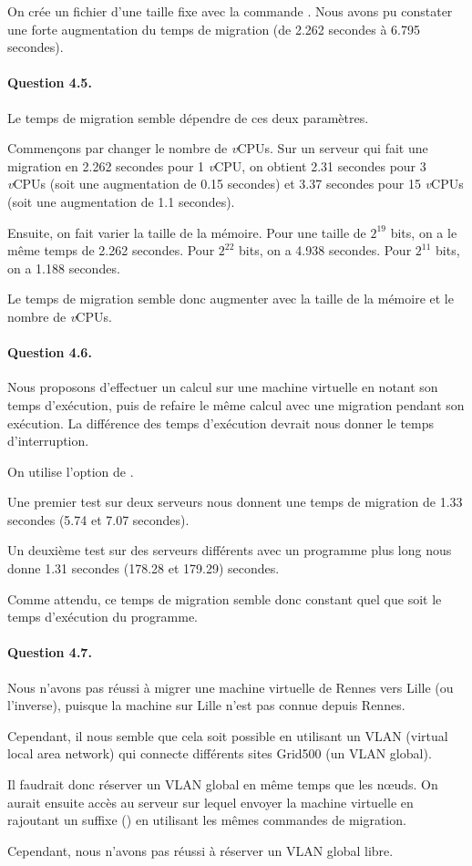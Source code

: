 \documentclass[12pt]{article}
\begin{document}
On crée un fichier d'une taille fixe avec la commande . Nous avons pu constater une forte augmentation du temps de migration (de 2.262 secondes à 6.795 secondes). 


\paragraph{Question 4.5.}

\def\vcpu{\textit{v}CPU}

Le temps de migration semble dépendre de ces deux paramètres.

Commençons par changer le nombre de \vcpu s. Sur un serveur qui fait une migration en 2.262 secondes pour 1 \vcpu, on obtient 2.31 secondes pour 3 \vcpu s (soit une augmentation de 0.15 secondes) et 3.37 secondes pour 15 \vcpu s (soit une augmentation de 1.1 secondes).

Ensuite, on fait varier la taille de la mémoire.
Pour une taille de $2^{19}$ bits, on a le même temps de 2.262 secondes.
Pour $2^{22}$ bits, on a 4.938 secondes.
Pour $2^{11}$ bits, on a 1.188 secondes.

Le temps de migration semble donc augmenter avec la taille de la mémoire et le nombre de \vcpu s.


\paragraph{Question 4.6.}

Nous proposons d'effectuer un calcul sur une machine virtuelle en notant son temps d'exécution, puis de refaire le même calcul avec une migration pendant son exécution. La différence des temps d'exécution devrait nous donner le temps d'interruption.

On utilise l'option  de .

Une premier test sur deux serveurs nous donnent une temps de migration de 1.33 secondes (5.74 et 7.07 secondes).

Un deuxième test sur des serveurs différents avec un programme plus long nous donne 1.31 secondes (178.28 et 179.29) secondes.

Comme attendu, ce temps de migration semble donc constant quel que soit le temps d'exécution du programme.


\paragraph{Question 4.7.}
Nous n'avons pas réussi à migrer une machine virtuelle de Rennes vers Lille (ou l'inverse), puisque la machine sur Lille n'est pas connue depuis Rennes.

Cependant, il nous semble que cela soit possible en utilisant un VLAN (virtual local area network) qui connecte différents sites Grid500 (un VLAN global).

Il faudrait donc réserver un VLAN global en même temps que les n\oe uds. On aurait ensuite accès au serveur sur lequel envoyer la machine virtuelle en rajoutant un suffixe () en utilisant les mêmes commandes de migration.

Cependant, nous n'avons pas réussi à réserver un VLAN global libre.
\end{document}
